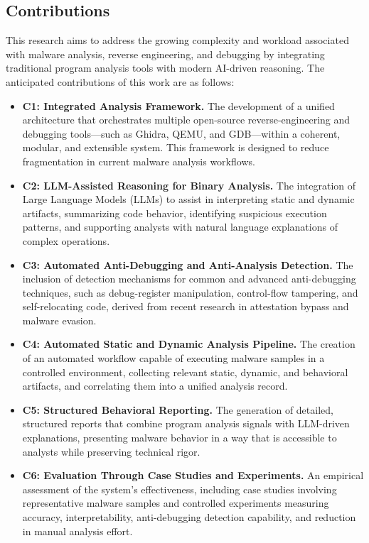 \documentclass[conference]{IEEEtran}
\begin{document}
\subsection{Contributions}
This research aims to address the growing complexity and workload associated with malware analysis, reverse engineering, and debugging by integrating traditional program analysis tools with modern AI-driven reasoning. The anticipated contributions of this work are as follows:

\begin{itemize}
    \item \textbf{C1: Integrated Analysis Framework.}  
    The development of a unified architecture that orchestrates multiple open-source reverse-engineering and debugging tools—such as Ghidra, QEMU, and GDB—within a coherent, modular, and extensible system. This framework is designed to reduce fragmentation in current malware analysis workflows.

    \item \textbf{C2: LLM-Assisted Reasoning for Binary Analysis.}  
    The integration of Large Language Models (LLMs) to assist in interpreting static and dynamic artifacts, summarizing code behavior, identifying suspicious execution patterns, and supporting analysts with natural language explanations of complex operations.

    \item \textbf{C3: Automated Anti-Debugging and Anti-Analysis Detection.}  
    The inclusion of detection mechanisms for common and advanced anti-debugging techniques, such as debug-register manipulation, control-flow tampering, and self-relocating code, derived from recent research in attestation bypass and malware evasion.

    \item \textbf{C4: Automated Static and Dynamic Analysis Pipeline.}  
    The creation of an automated workflow capable of executing malware samples in a controlled environment, collecting relevant static, dynamic, and behavioral artifacts, and correlating them into a unified analysis record.

    \item \textbf{C5: Structured Behavioral Reporting.}  
    The generation of detailed, structured reports that combine program analysis signals with LLM-driven explanations, presenting malware behavior in a way that is accessible to analysts while preserving technical rigor.

    \item \textbf{C6: Evaluation Through Case Studies and Experiments.}  
    An empirical assessment of the system’s effectiveness, including case studies involving representative malware samples and controlled experiments measuring accuracy, interpretability, anti-debugging detection capability, and reduction in manual analysis effort.
\end{itemize}
\end{document}

